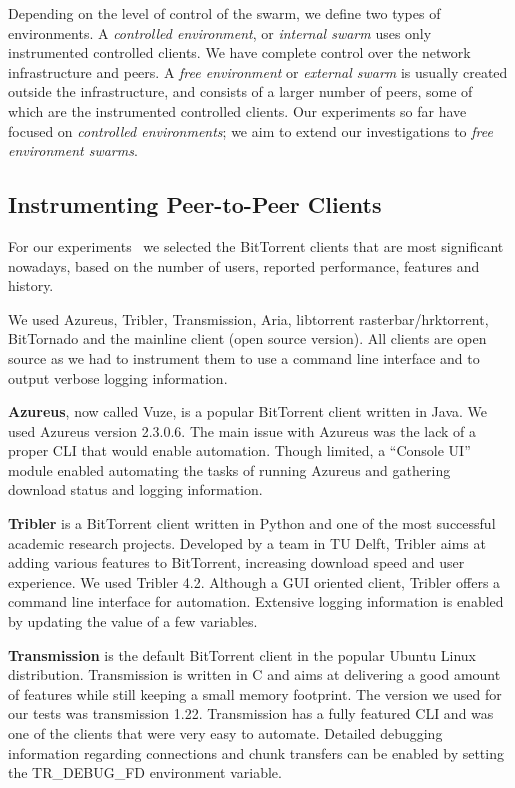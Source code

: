 Depending on the level of control of the swarm, we define two types of
environments. A \textit{controlled environment}, or \textit{internal swarm}
uses only instrumented controlled clients. We have complete control over the
network infrastructure and peers. A \textit{free environment} or
\textit{external swarm} is usually created outside the infrastructure, and
consists of a larger number of peers, some of which are the instrumented
controlled clients. Our experiments so far have focused on \textit{controlled
environments}; we aim to extend our investigations to \textit{free environment
swarms}.

\subsection{Instrumenting Peer-to-Peer Clients}

For our experiments~\cite{bt-pef} we selected the BitTorrent clients that are
most significant nowadays, based on the number of users, reported performance,
features and history.

We used Azureus, Tribler, Transmission, Aria, libtorrent rasterbar/hrktorrent,
BitTornado and the mainline client (open source version). All clients are open
source as we had to instrument them to use a command line interface and to
output verbose logging information.

\textbf{Azureus}, now called Vuze, is a popular BitTorrent client written in
Java. We used Azureus version 2.3.0.6. The main issue with Azureus was the
lack of a proper CLI that would enable automation. Though limited, a ``Console
UI'' module enabled automating the tasks of running Azureus and gathering
download status and logging information.

\textbf{Tribler} is a BitTorrent client written in Python and one of the most
successful academic research projects. Developed by a team in TU Delft,
Tribler aims at adding various features to BitTorrent, increasing download
speed and user experience. We used Tribler 4.2. Although a GUI oriented
client, Tribler offers a command line interface for automation. Extensive
logging information is enabled by updating the value of a few variables.

\textbf{Transmission} is the default BitTorrent client in the popular Ubuntu
Linux distribution. Transmission is written in C and aims at delivering a good
amount of features while still keeping a small memory footprint. The version
we used for our tests was transmission 1.22. Transmission has a fully
featured CLI and was one of the clients that were very easy to automate.
Detailed debugging information regarding connections and chunk transfers can
be enabled by setting the TR\_DEBUG\_FD environment variable.

